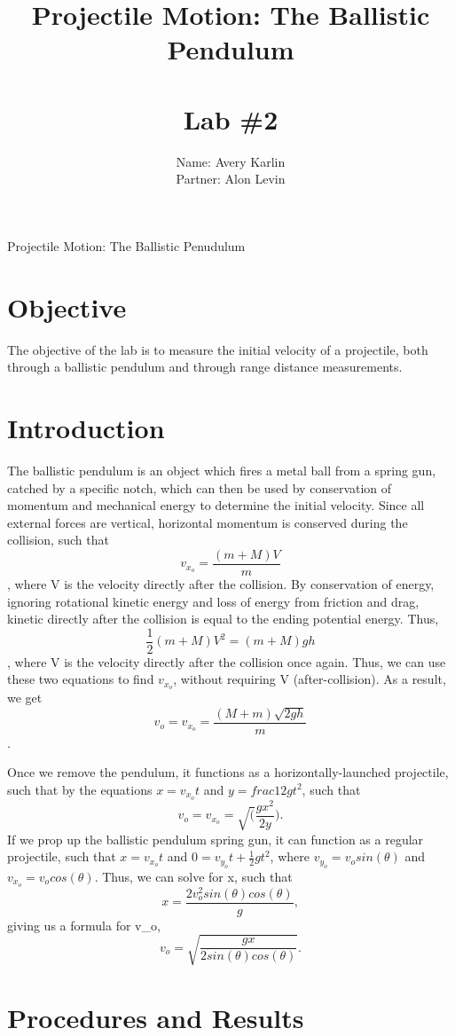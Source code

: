 \documentclass[11pt, titlepage]{article}
\title{Projectile Motion: The Ballistic Pendulum \\ \ \\ \large Lab \#2}
\author{Name: Avery Karlin \\ Partner: Alon Levin}
\date{}
\begin{document}
\maketitle

\begin{center}
\LARGE Projectile Motion: The Ballistic Penudulum
\end{center}

\section*{Objective}
The objective of the lab is to measure the initial velocity of a projectile, both through a ballistic pendulum and through range distance measurements. 
\section*{Introduction}
The ballistic pendulum is an object which fires a metal ball from a spring gun, catched by a specific notch, which can then be used by conservation of momentum and mechanical energy to determine the initial velocity. Since all external forces are vertical, horizontal momentum is conserved during the collision, such that $$v_{x_o} = \frac{(m + M)V}{m}$$, where V is the velocity directly after the collision. By conservation of energy, ignoring rotational kinetic energy and loss of energy from friction and drag, kinetic directly after the collision is equal to the ending potential energy. Thus, $$\frac{1}{2}(m + M)V^2 = (m + M)gh$$, where V is the velocity directly after the collision once again. Thus, we can use these two equations to find $v_{x_o}$, without requiring V (after-collision). As a result, we get $$v_o = v_{x_o} = \frac{(M+m)\sqrt{2gh}}{m}$$.

Once we remove the pendulum, it functions as a horizontally-launched projectile, such that by the equations $x = v_{x_o}t$ and $y = frac{1}{2}gt^2$, such that $$v_o = v_{x_o} = \sqrt(\frac{gx^2}{2y}).$$ If we prop up the ballistic pendulum spring gun, it can function as a regular projectile, such that $x = v_{x_o}t$ and $0 = v_{y_o}t + \frac{1}{2}gt^2$, where $v_{y_o} = v_osin(\theta)$ and $v_{x_o} = v_ocos(\theta)$. Thus, we can solve for x, such that $$x = \frac{2v_o^2sin(\theta)cos(\theta)}{g},$$ giving us a formula for v_o, $$v_o = \sqrt{\frac{gx}{2sin(\theta)cos(\theta)}}.$$

\section*{Procedures and Results}
\end{document}
